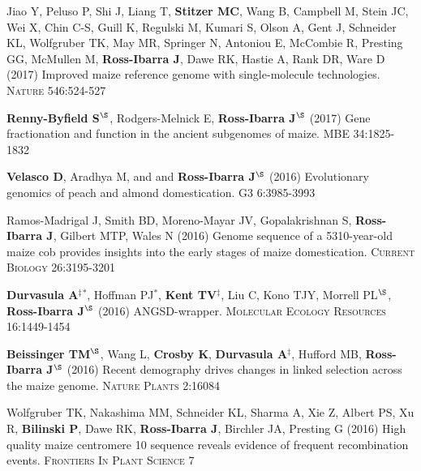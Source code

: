 \begin{etaremune}
\item  Jiao Y, Peluso P,  Shi J,  Liang T, {\bf Stitzer MC}, Wang B,  Campbell M, Stein JC,  Wei X,  Chin C-S,  Guill K,  Regulski M,  Kumari S,  Olson A,  Gent J, Schneider KL,  Wolfgruber TK, May MR, Springer N,  Antoniou E,  McCombie R, Presting GG,  McMullen M, {\bf Ross-Ibarra J}, Dawe RK,  Hastie A, Rank DR, Ware D (2017) Improved maize reference genome with single-molecule technologies. \textsc{Nature}  546:524-527

\item  {\bf Renny-Byfield S}$^\S$, Rodgers-Melnick E, {\bf Ross-Ibarra J}$^\S$ (2017) Gene fractionation and function in the ancient subgenomes of maize. \textsc{MBE} 34:1825-1832

\item {\bf Velasco D}, Aradhya M, and  and {\bf Ross-Ibarra J}$^\S$ (2016) Evolutionary genomics of peach and almond domestication. \textsc{G3} 6:3985-3993

\item Ramos-Madrigal J, Smith BD, Moreno-Mayar JV, Gopalakrishnan S, {\bf Ross-Ibarra J}, Gilbert MTP, Wales N (2016) Genome sequence of a 5310-year-old maize cob provides insights into the early stages of maize domestication. \textsc{Current Biology} 26:3195-3201

\item {\bf Durvasula A}$^\ddagger$$^*$,  Hoffman PJ$^*$, {\bf Kent TV}$^\ddagger$, Liu C, Kono TJY, Morrell PL$^\S$, {\bf Ross-Ibarra J}$^\S$ (2016) ANGSD-wrapper. \textsc{Molecular Ecology Resources} 16:1449-1454

\item {\bf Beissinger TM}$^\S$, Wang L, {\bf Crosby K}, {\bf Durvasula A}$^\ddagger$, Hufford MB, {\bf Ross-Ibarra J}$^\S$ (2016)  Recent demography drives changes in linked selection across the maize genome. \textsc{Nature Plants} 2:16084

\item Wolfgruber TK, Nakashima MM, Schneider KL, Sharma A, Xie Z, Albert PS, Xu R, {\bf Bilinski P},  Dawe RK, {\bf Ross-Ibarra J}, Birchler JA, Presting G (2016) High quality maize centromere 10 sequence reveals evidence of frequent recombination events. \textsc{Frontiers In Plant Science} 7


\end{etaremune}
